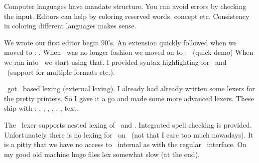 
\definecolor[verydark][s=.2]

\startdocument
  [title=Lexing sources,
   color=verydark]

\StartSteps

\startsubject[title=What is lexing]

    \startitemize[packed]
    \startitem Computer languages have mandate structure. \stopitem \FlushStep
    \startitem You can avoid errors by checking the input. \stopitem \FlushStep
    \startitem Editors can help by coloring reserved words, concept etc. \stopitem \FlushStep
    \startitem Consistency in coloring different languages makes sense. \stopitem \FlushStep
    \stopitemize

\stopsubject

\startsubject[title=When did we start]

    \startitemize[packed]
    \startitem We wrote our first editor begin 90's. \stopitem \FlushStep
    \startitem An extension quickly followed when we moved to \TEX: \TEXEDIT. \stopitem \FlushStep
    \startitem When \MODULA\ was no longer fashion we moved on to \PERL: \TEXWORK\ (quick demo) \stopitem \FlushStep
    \startitem When we ran into \SCITE\ we start using that. \stopitem \FlushStep
    \startitem I provided syntax highlighting for \TEX\ and \METAPOST\ (support for multiple formats etc.). \stopitem \FlushStep
    \stopitemize

\stopsubject

\StopSteps

\page

\StartSteps

\startsubject[title=Side effect of \MKIV]

    \startitemize[packed]
    \startitem \SCITE\ got \LPEG\ based lexing (external lexing). \stopitem \FlushStep
    \startitem I already had already written some lexers for the pretty printers. \stopitem \FlushStep
    \startitem So I gave it a go and made some more advanced lexers. \stopitem \FlushStep
    \startitem These ship with \CONTEXT: \TEX, \XML, \PDF, \LUA, \CLD, \METAPOST, text. \stopitem \FlushStep
    \stopitemize

\stopsubject

\startsubject[title=Characteristics]

    \startitemize[packed]
    \startitem The \TEX\ lexer supports nested lexing of \LUA\ and \METAPOST. \stopitem \FlushStep
    \startitem Integrated spell checking is provided. \stopitem \FlushStep
    \startitem Unfortunately there is no lexing for \SCITE\ on \MACOSX\ (not that I care too much nowadays). \stopitem \FlushStep
    \startitem It is a pitty that we have no access to \SCITE\ internal as with the regular \LUA\ interface. \stopitem \FlushStep
    \startitem On my good old machine huge files lex somewhat slow (at the end). \stopitem \FlushStep
    \stopitemize

